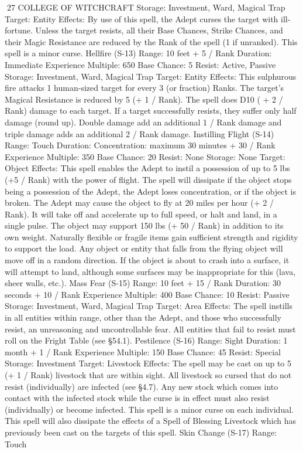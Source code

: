 \documentclass[a4paper]{article}
\begin{document}
\begin{multicols}{3}
27 COLLEGE OF WITCHCRAFT
Storage: Investment, Ward, Magical Trap
Target: Entity
Effects: By use of this spell, the Adept curses the
target with ill-fortune. Unless the target resists, all
their Base Chances, Strike Chances, and their
Magic Resistance are reduced by the Rank of the
spell (1 if unranked). This spell is a minor curse.
Hellfire (S-13)
Range: 10 feet + 5 / Rank
Duration: Immediate
Experience Multiple: 650
Base Chance: 5%
Resist: Active, Passive
Storage: Investment, Ward, Magical Trap
Target: Entity
Effects: This sulphurous fire attacks 1 human-sized
target for every 3 (or fraction) Ranks. The target’s
Magical Resistance is reduced by 5 (+ 1 / Rank).
The spell does D10 ( + 2 / Rank) damage to each
target. If a target successfully resists, they suffer
only half damage (round up). Double damage add
an additional 1 / Rank damage and triple damage
adds an additional 2 / Rank damage.
Instilling Flight (S-14)
Range: Touch
Duration: Concentration: maximum 30 minutes +
30 / Rank
Experience Multiple: 350
Base Chance: 20%
Resist: None
Storage: None
Target: Object
Effects: This spell enables the Adept to instil a
possession of up to 5 lbs (+5 / Rank) with the
power of flight. The spell will dissipate if the object stops being a possession of the Adept, the
Adept loses concentration, or if the object is broken. The Adept may cause the object to fly at 20
miles per hour (+ 2 / Rank). It will take off and
accelerate up to full speed, or halt and land, in a
single pulse. The object may support 150 lbs (+ 50
/ Rank) in addition to its own weight. Naturally
flexible or fragile items gain sufficient strength and
rigidity to support the load. Any object or entity
that falls from the flying object will move off in a
random direction. If the object is about to crash
into a surface, it will attempt to land, although
some surfaces may be inappropriate for this (lava,
sheer walls, etc.).
Mass Fear (S-15)
Range: 10 feet + 15 / Rank
Duration: 30 seconds + 10 / Rank
Experience Multiple: 400
Base Chance: 10%
Resist: Passive
Storage: Investment, Ward, Magical Trap
Target: Area
Effects: The spell instills in all entities within
range, other than the Adept, and those who successfully resist, an unreasoning and uncontrollable
fear. All entities that fail to resist must roll on the
Fright Table (see §54.1).
Pestilence (S-16)
Range: Sight
Duration: 1 month + 1 / Rank
Experience Multiple: 150
Base Chance: 45%
Resist: Special
Storage: Investment
Target: Livestock
Effects: The spell may be cast on up to 5 (+ 1 /
Rank) livestock that are within sight. All livestock
so cursed that do not resist (individually) are infected (see §4.7). Any new stock which comes into
contact with the infected stock while the curse is in
effect must also resist (individually) or become
infected. This spell is a minor curse on each individual. This spell will also dissipate the effects of a
Spell of Blessing Livestock which has previously
been cast on the targets of this spell.
Skin Change (S-17)
Range: Touch


\end{multicols}
\end{document}
